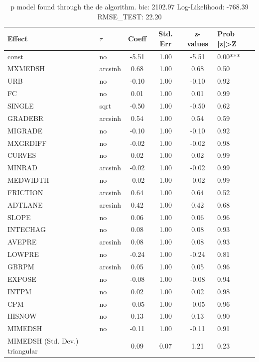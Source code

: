 \begin{table}
	\caption{p model found through the de algorithm. bic: 2102.97 Log-Likelihood: -768.39 RMSE_TEST: 22.20}
	\begin{center}
		\begin{tabular}{|l|l|c|c|c|l|}
			\hline
			Effect & $\tau$ & Coeff & Std. Err & z-values & Prob |z|>Z \\
			\hline
			const & no & -5.51 & 1.00 & -5.51 & 0.00*** \\
			\hline
			MXMEDSH & arcsinh & 0.68 & 1.00 & 0.68 & 0.50 \\
			\hline
			URB & no & -0.10 & 1.00 & -0.10 & 0.92 \\
			\hline
			FC & no & 0.01 & 1.00 & 0.01 & 0.99 \\
			\hline
			SINGLE & sqrt & -0.50 & 1.00 & -0.50 & 0.62 \\
			\hline
			GRADEBR & arcsinh & 0.54 & 1.00 & 0.54 & 0.59 \\
			\hline
			MIGRADE & no & -0.10 & 1.00 & -0.10 & 0.92 \\
			\hline
			MXGRDIFF & no & -0.02 & 1.00 & -0.02 & 0.98 \\
			\hline
			CURVES & no & 0.02 & 1.00 & 0.02 & 0.99 \\
			\hline
			MINRAD & arcsinh & -0.02 & 1.00 & -0.02 & 0.99 \\
			\hline
			MEDWIDTH & no & -0.02 & 1.00 & -0.02 & 0.99 \\
			\hline
			FRICTION & arcsinh & 0.64 & 1.00 & 0.64 & 0.52 \\
			\hline
			ADTLANE & arcsinh & 0.42 & 1.00 & 0.42 & 0.68 \\
			\hline
			SLOPE & no & 0.06 & 1.00 & 0.06 & 0.96 \\
			\hline
			INTECHAG & no & 0.08 & 1.00 & 0.08 & 0.93 \\
			\hline
			AVEPRE & arcsinh & 0.08 & 1.00 & 0.08 & 0.93 \\
			\hline
			LOWPRE & no & -0.24 & 1.00 & -0.24 & 0.81 \\
			\hline
			GBRPM & arcsinh & 0.05 & 1.00 & 0.05 & 0.96 \\
			\hline
			EXPOSE & no & -0.08 & 1.00 & -0.08 & 0.94 \\
			\hline
			INTPM & no & 0.02 & 1.00 & 0.02 & 0.98 \\
			\hline
			CPM & no & -0.05 & 1.00 & -0.05 & 0.96 \\
			\hline
			HISNOW & no & 0.13 & 1.00 & 0.13 & 0.90 \\
			\hline
			MIMEDSH & no & -0.11 & 1.00 & -0.11 & 0.91 \\
			\hline
			MIMEDSH (Std. Dev.) triangular &  & 0.09 & 0.07 & 1.21 & 0.23 \\
			\hline
		\end{tabular}
	\end{center}
\end{table}